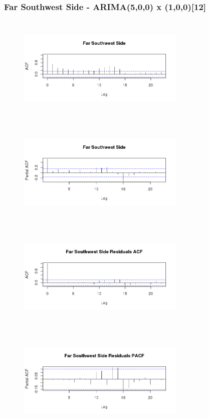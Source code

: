 \documentclass{article} %
\begin{document}
\subsubsection{Far Southwest Side - ARIMA(5,0,0) x (1,0,0)[12]}
\begin{multicols}{2} 
\begin{figure}[H]
\includegraphics[height=50mm, width=80mm]{Plots/far_southwest_acf.png}
\end{figure}
 
\begin{figure}[H]
\includegraphics[height=50mm, width=80mm]{Plots/far_southwest_pacf.png}
\end{figure}
 
\begin{figure}[H]
\includegraphics[height=50mm, width=80mm]{Plots/far_southwest_resid_acf.png}
\end{figure}
 
\begin{figure}[H]
\includegraphics[height=50mm, width=80mm]{Plots/far_southwest_resid_pacf.png}
\end{figure}
 
\end{multicols}
 
\end{document}
